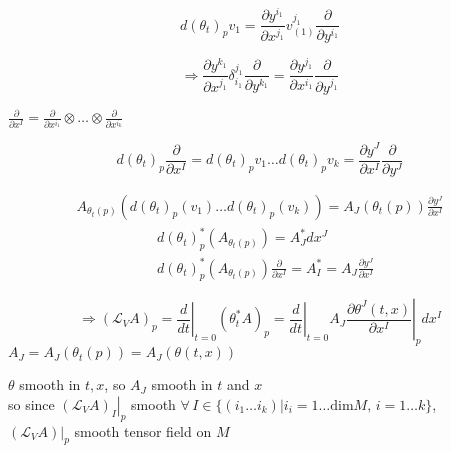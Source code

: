 \[
d(\theta_t)_p v_1  = \frac{ \partial y^{i_1}}{ \partial x^{j_1}} v^{j_1}_{(1)} \frac{ \partial }{ \partial y^{i_1}}
\]


\[
\Longrightarrow \frac{ \partial y^{k_1} }{ \partial x^{j_1} } \delta^{j_1}_{i_1} \frac{ \partial }{ \partial y^{k_1}} = \frac{ \partial y^{j_1}}{ \partial x^{i_1}} \frac{ \partial }{ \partial y^{j_1}} 
\]

$\frac{ \partial }{ \partial x^I} = \frac{ \partial }{ \partial x^{i_1} } \otimes \dots \otimes \frac{ \partial }{ \partial x^{i_k} }$

\[
d(\theta_t)_p \frac{ \partial }{ \partial x^I} = d(\theta_t)_pv_1 \dots d(\theta_t)_pv_k =  \frac{ \partial y^J}{ \partial x^I} \frac{ \partial }{ \partial y^J}
\]







\[
\begin{gathered}
  A_{\theta_t(p)}(d(\theta_t)_p(v_1) \dots d(\theta_t)_p(v_k) ) = A_J(\theta_t(p))\frac{ \partial y^J}{ \partial x^I} 
\end{gathered}
\]
\[
\begin{aligned}
  & d(\theta_t)^*_p(A_{\theta_t(p)}) = A^*_J dx^J \\ 
  &  d(\theta_t)^*_p(A_{\theta_t(p)}) \frac{ \partial }{ \partial x^I} = A_I^* = A_J \frac{ \partial y^J}{ \partial x^I }
\end{aligned}
\]

\[
\Longrightarrow ( \mathcal{L}_VA)_p = \left. \frac{d}{dt} \right|_{t=0} (\theta_t^* A)_p = \left. \frac{d}{dt} \right|_{t=0} A_J \left. \frac{ \partial \theta^J(t,x) }{ \partial x^I } \right|_p dx^I
\]
$A_J = A_J(\theta_t(p)) = A_J(\theta(t,x))$

$\theta$ smooth in $t,x$, so $A_J$ smooth in $t$ and $x$  \\

so since $\left. \left( \mathcal{L}_VA\right)_I \right|_p$ smooth $\forall \, I \in \lbrace (i_1 \dots i_k) | i_i = 1 \dots \text{dim}{M}, \, i = 1 \dots k \rbrace$, \\
\quad $\left. (\mathcal{L}_VA)  \right|_p$ smooth tensor field on $M$




